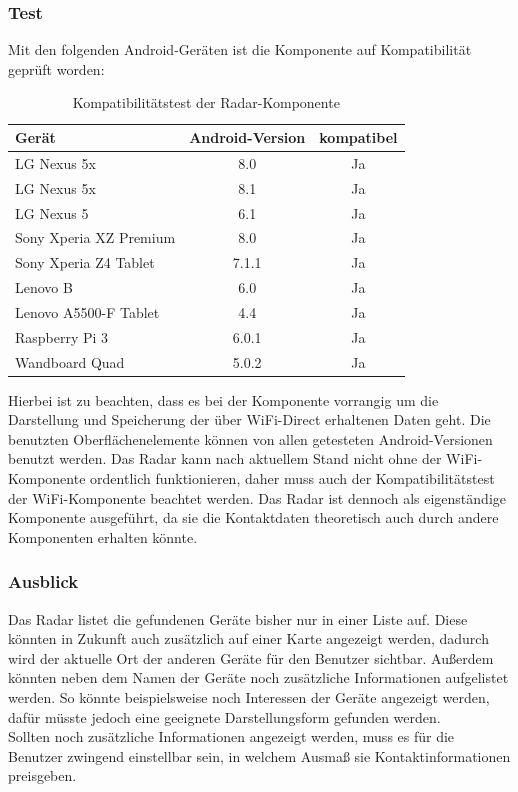 \subsubsection{Test}
Mit den folgenden Android-Geräten ist die Komponente auf Kompatibilität geprüft worden:
\begin{table}[H]
	\begin{center}
		\caption{Kompatibilitätstest der Radar-Komponente}
		\label{tab:dimensions}
		\begin{tabular}{l|c|c} 			
			Gerät & Android-Version & kompatibel \\
			\hline
			LG Nexus 5x & 8.0 & Ja\\
			LG Nexus 5x & 8.1 & Ja\\
			LG Nexus 5 & 6.1 & Ja\\
			Sony Xperia XZ Premium & 8.0 & Ja\\
			Sony Xperia Z4 Tablet & 7.1.1 & Ja\\
			Lenovo B & 6.0 & Ja\\
			Lenovo A5500-F Tablet & 4.4 & Ja\\
			Raspberry Pi 3 & 6.0.1 & Ja\\	
			Wandboard Quad & 5.0.2 & Ja\\			
		\end{tabular}
	\end{center}
\end{table}
Hierbei ist zu beachten, dass es bei der Komponente vorrangig um die Darstellung und Speicherung der über WiFi-Direct erhaltenen Daten geht. Die benutzten Oberflächenelemente können von allen getesteten Android-Versionen benutzt werden. Das Radar kann nach aktuellem Stand nicht ohne der WiFi-Komponente ordentlich funktionieren, daher muss auch der Kompatibilitätstest der WiFi-Komponente beachtet werden. Das Radar ist dennoch als eigenständige Komponente ausgeführt, da sie die Kontaktdaten theoretisch auch durch andere Komponenten erhalten könnte.  

\subsubsection{Ausblick}
Das Radar listet die gefundenen Geräte bisher nur in einer Liste auf. Diese könnten in Zukunft auch zusätzlich auf einer Karte angezeigt werden, dadurch wird der aktuelle Ort der anderen Geräte für den Benutzer sichtbar. Außerdem könnten neben dem Namen der Geräte noch zusätzliche Informationen aufgelistet werden. So könnte beispielsweise noch Interessen der Geräte angezeigt werden, dafür müsste jedoch eine geeignete Darstellungsform gefunden werden.
\\Sollten noch zusätzliche Informationen angezeigt werden, muss es für die Benutzer zwingend einstellbar sein, in welchem Ausmaß sie Kontaktinformationen preisgeben.  
\newpage